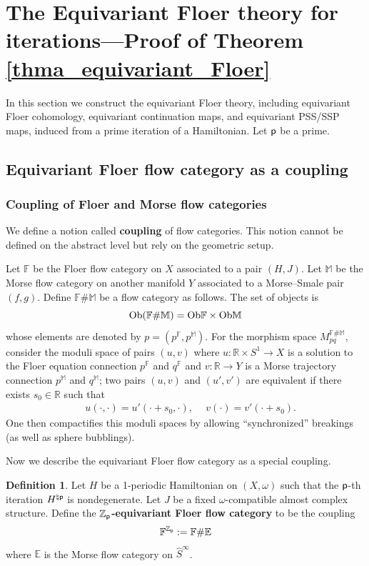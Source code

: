 \documentclass[reqno, 10pt]{amsart}
\numberwithin{equation}{section}
\numberwithin{equation}{section}
\theoremstyle{definition}
\newtheorem{defn}[thm]{Definition}
\theoremstyle{remark}
\newcommand{\beqn}{\begin{equation*}}
\newcommand{\eeqn}{\end{equation*}}
\newcommand{\mb}{\mathbb}
\newcommand{\p}{{\sf p}}
\newcommand{\zp}{{{\mb Z}_{\sf p}}}
\newcommand{\wh}{\widehat}
\begin{document}
\section{The Equivariant Floer theory for iterations---Proof of Theorem \ref{thma_equivariant_Floer}}

In this section we construct the equivariant Floer theory, including equivariant Floer cohomology, equivariant continuation maps, and equivariant PSS/SSP maps, induced from a prime iteration of a Hamiltonian. Let $\p$ be a prime. 

\subsection{Equivariant Floer flow category as a coupling}

\subsubsection{Coupling of Floer and Morse flow categories}

We define a notion called {\bf coupling} of flow categories. This notion cannot be defined on the abstract level but rely on the geometric setup. 

Let ${\mb F}$ be the Floer flow category on $X$ associated to a pair $(H, J)$. Let ${\mb M}$ be the Morse flow category on another manifold $Y$ associated to a Morse--Smale pair $(f, g)$. Define ${\mb F} \# {\mb M}$ be a flow category as follows. The set of objects is 
\beqn
{\rm Ob} ( {\mb F} \# {\mb M} ) = {\rm Ob} {\mb F} \times {\rm Ob}{\mb M}
\eeqn
whose elements are denoted by $p = ( p^{\mb F}, p^{\mb M})$. For the morphism space $M_{pq}^{{\mb F}\# {\mb M}}$, consider the moduli space of pairs $(u, v)$ where $u: {\mb R}\times S^1 \to X$ is a solution to the Floer equation connection $p^{\mb F}$ and $q^{\mb F}$ and $v: {\mb R} \to Y$ is a Morse trajectory connection $p^{\mb M}$ and $q^{\mb M}$; two pairs $(u, v)$ and $(u', v')$ are equivalent if there exists $s_0 \in {\mb R}$ such that 
\begin{align*}
    &\ u(\cdot, \cdot) = u'(\cdot + s_0, \cdot),\ &\ v(\cdot) = v'(\cdot + s_0).
\end{align*}
One then compactifies this moduli spaces by allowing ``synchronized'' breakings (as well as sphere bubblings). 




Now we describe the equivariant Floer flow category as a special coupling. 

\begin{defn}\label{defn_equi_flow_category}
Let $H$ be a 1-periodic Hamiltonian on $(X, \omega)$ such that the $\p$-th iteration $H^{\natural \p}$ is nondegenerate. Let $J$ be a fixed $\omega$-compatible almost complex structure. Define the {\bf $\zp$-equivariant Floer flow category} to be the coupling
\beqn
{\mb F}^{\zp}:= {\mb F} \# {\mb E}
\eeqn
where ${\mb E}$ is the Morse flow category on $\wh S^\infty$.
\end{defn}
\end{document}
